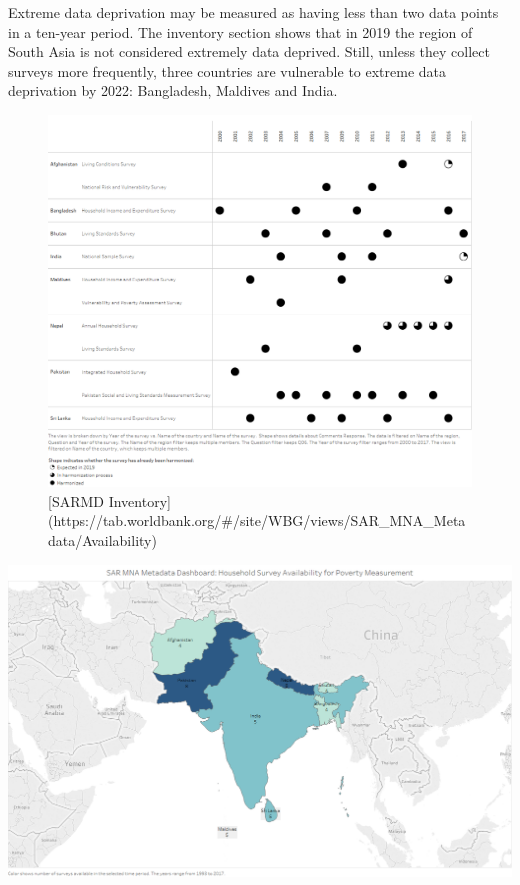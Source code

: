 \documentclass[13 pt,]{book}
\begin{document}
Extreme data deprivation may be measured as having less than two data
points in a ten-year period. The inventory section shows that in 2019
the region of South Asia is not considered extremely data deprived.
Still, unless they collect surveys more frequently, three countries are
vulnerable to extreme data deprivation by 2022: Bangladesh, Maldives and
India.

\begin{figure}

{\centering \includegraphics[width=15.07in]{figures/Inventory} 

}

\caption{[SARMD Inventory](https://tab.worldbank.org/#/site/WBG/views/SAR_MNA_Metadata/Availability)}\label{fig:inv}
\end{figure}

\href{https://tab.worldbank.org/\#/site/WBG/views/SAR_MNA_Metadata/Map}{\includegraphics{figures/Inventory_map.png}}
\end{document}
